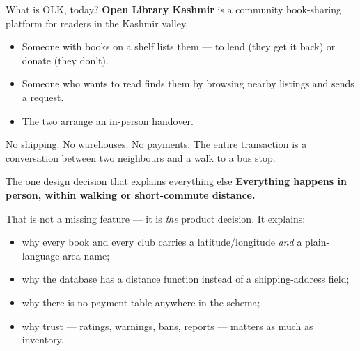 \documentclass[aspectratio=169,11pt]{beamer}
\begin{document}
\begin{frame}{What is OLK, today?}
  \textbf{Open Library Kashmir} is a community book-sharing platform for readers in the Kashmir valley.
  \begin{itemize}
    \item Someone with books on a shelf lists them --- to \alert{lend} (they get it back) or \alert{donate} (they don't).
    \item Someone who wants to read finds them by browsing \alert{nearby} listings and sends a request.
    \item The two arrange an in-person handover.
  \end{itemize}
  \vfill
  \begin{block}{No shipping. No warehouses. No payments.}
    The entire transaction is a conversation between two neighbours and a walk to a bus stop.
  \end{block}
\end{frame}

\begin{frame}{The one design decision that explains everything else}
  \textbf{Everything happens in person, within walking or short-commute distance.}
  \vspace{4pt}

  That is not a missing feature --- it is \emph{the} product decision. It explains:
  \begin{itemize}
    \item why every book and every club carries a latitude/longitude \emph{and} a plain-language area name;
    \item why the database has a distance function instead of a shipping-address field;
    \item why there is no payment table anywhere in the schema;
    \item why \alert{trust} --- ratings, warnings, bans, reports --- matters as much as inventory.
  \end{itemize}
\end{frame}
\end{document}
